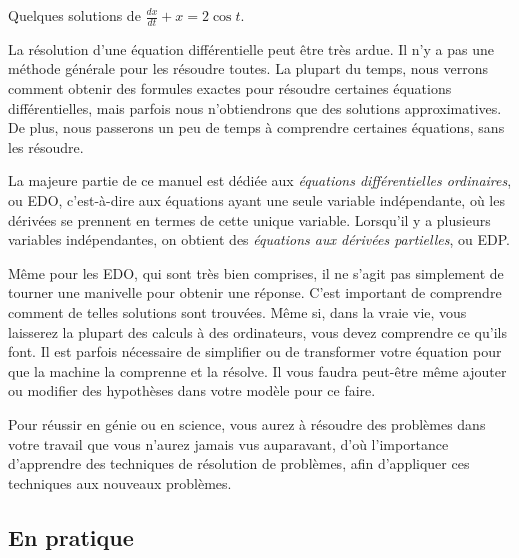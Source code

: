 \begin{mywrapfig}{3.25in}
\capstart {}
\caption{Quelques solutions de $\frac{dx}{dt} + x = 2 \cos t$.\label{intro:plotsfig}}
\end{mywrapfig}%

La résolution d'une équation différentielle peut être très ardue.  Il n'y a pas une méthode générale pour les résoudre toutes. 
La plupart du temps, nous verrons comment obtenir des formules exactes pour résoudre certaines équations différentielles, 
mais parfois nous n'obtiendrons que des solutions approximatives. De plus, nous passerons un peu de temps à comprendre certaines équations, sans les résoudre.

La majeure partie de ce manuel est dédiée aux 
\emph{équations différentielles ordinaires},
ou EDO, c'est-à-dire aux équations ayant une seule variable indépendante, où les dérivées se prennent en termes de cette unique variable.  
Lorsqu'il y a plusieurs variables indépendantes, on obtient des 
\emph{équations aux dérivées partielles},
ou EDP.

Même pour les EDO, qui sont très bien comprises, il ne s'agit pas simplement de tourner une manivelle pour obtenir une réponse.  
C'est important de comprendre comment de telles solutions sont trouvées. 
Même si, dans la vraie vie, vous laisserez la plupart des calculs à des ordinateurs, vous devez comprendre ce qu'ils font.  
Il est parfois nécessaire de simplifier ou de transformer votre équation pour que la machine la comprenne et la résolve.  
Il vous faudra peut-être même ajouter ou modifier des hypothèses dans votre modèle pour ce faire.
  
Pour réussir en génie ou en science, vous aurez à résoudre des problèmes dans votre travail que vous n'aurez jamais vus auparavant, 
d'où l'importance d'apprendre des techniques de résolution de problèmes, afin d'appliquer ces techniques aux nouveaux problèmes.  
 
\subsection{En pratique}
\begin{myfig}
\end{myfig}

